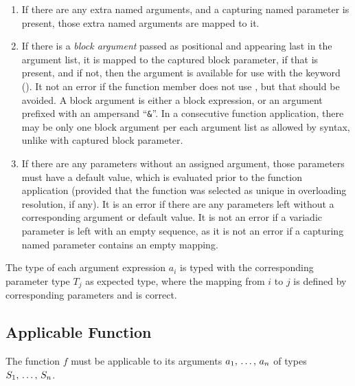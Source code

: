 \begin{enumerate}
  \item If there are any extra named arguments, and a capturing named parameter is present, those extra named arguments are mapped to it. 
  
  \item If there is a {\em block argument} passed as positional and appearing last in the argument list, it is mapped to the captured block parameter, if that is present, and if not, then the argument is available for use with the  keyword (). It not an error if the function member does not use , but that should be avoided. A block argument is either a block expression, or an argument prefixed with an ampersand ``\lstinline!&!''. In a consecutive function application, there may be only one block argument per each argument list as allowed by syntax, unlike with captured block parameter. 
  
  \item If there are any parameters without an assigned argument, those parameters must have a default value, which is evaluated prior to the function application (provided that the function was selected as unique in overloading resolution, if any). It is an error if there are any parameters left without a corresponding argument or default value. It is not an error if a variadic parameter is left with an empty sequence, as it is not an error if a capturing named parameter contains an empty mapping. 
  
\end{enumerate}

The type of each argument expression $a_i$ is typed with the corresponding parameter type $T_j$ as expected type, where the mapping from $i$ to $j$ is defined by corresponding parameters and is correct. 






\subsection{Applicable Function}

The function $f$ must be applicable to its arguments $a_1 ,\, \ldots ,\, a_n$ of types $S_1 ,\, \ldots ,\, S_n$. 

